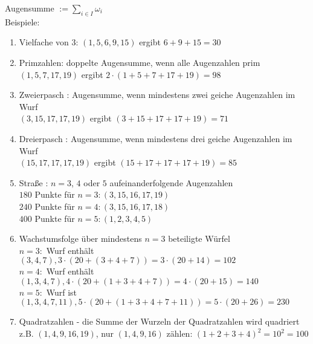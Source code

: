 \documentclass[a4paper,11pt]{exam}
\begin{document}
Augensumme $:= \displaystyle\sum_{i\in I}\omega_i$
\newline\newline\newline
\vspace{0.5cm}\\
\noindent Beispiele: %
\vspace{0.5cm}
\begin{enumerate}
\item Vielfache von 3: $( 1,5, 6, 9, 15 )$ ergibt $ 6 + 9 +15 = 30 $ 
\item Primzahlen: doppelte Augensumme, wenn alle Augenzahlen prim \\
             $( 1,5, 7, 17, 19 )$ ergibt $2\cdot(1+5+7+17+19) = 98 $
\item Zweierpasch : Augensumme, 
                    wenn mindestens zwei geiche Augenzahlen im Wurf\\
                     $( 3,15,17,17,19 )$ ergibt $(3+15+17+17+19) = 71 $
\item Dreierpasch : Augensumme, 
                    wenn mindestens drei geiche Augenzahlen im Wurf\\
                     $( 15,17,17,17,19 )$ ergibt $(15+17+17+17+19) = 85 $
\item Straße : $n=3$, $4$ oder $5$ aufeinanderfolgende Augenzahlen\\
                $180$ Punkte für $n=3: ( 3,15,16,17,19 )$ \\   
                $240$ Punkte für $n=4: ( 3,15,16,17,18 )$ \\   
                $400$ Punkte für $n=5: ( 1,2,3,4,5 )$ 
\item Wachstumsfolge über mindestens $n=3$ beteiligte Würfel\\
       $n=3:$ Wurf enthält $(3,4,7), 3\cdot (20 + (3+4+7)) = 3\cdot (20+14)= 102 $\\
       $n=4:$ Wurf enthält $(1,3,4,7), 4\cdot (20 + (1+3+4+7)) = 4\cdot (20+15)= 140 $\\
       $n=5:$ Wurf ist   $(1,3,4,7,11), 5\cdot (20 + (1+3+4+7+11)) = 5\cdot (20+26)=230$
\item Quadratzahlen - die Summe der Wurzeln der Quadratzahlen wird quadriert\\
       z.B. $(1,4,9,16,19)$, nur $(1,4,9,16)$ zählen: $(1 + 2 + 3 +4)^2=10^2=100$

\end{enumerate}
\end{document}
